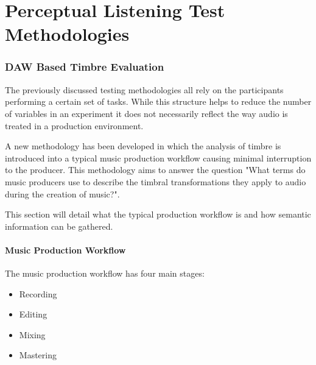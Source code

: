 \chapter{Perceptual Listening Test Methodologies}
\label{chap:ListeningTests}
%


	\subsection{DAW Based Timbre Evaluation} %
	\label{sec:ListeningTests-DistributedListeningTests-DAWBasedTimbreEvaluation}
		The previously discussed testing methodologies all rely on the participants performing a certain set of
		tasks. While this structure helps to reduce the number of variables in an experiment it does not necessarily
		reflect the way audio is treated in a production environment.

		A new methodology has been developed in which the analysis of timbre is introduced into a typical music
		production workflow causing minimal interruption to the producer. This methodology aims to answer the
		question "What terms do music producers use to describe the timbral transformations they apply to audio
		during the creation of music?". 
		
		This section will detail what the typical production workflow is and how semantic information can be
		gathered.

		\subsubsection{Music Production Workflow}

			The music production workflow has four main stages:

			\begin{itemize}
				\item Recording
				\item Editing
				\item Mixing
				\item Mastering
			\end{itemize}

